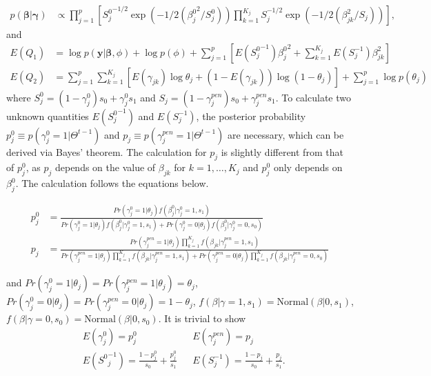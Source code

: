 \documentclass[AMA,STIX1COL,]{WileyNJD-v2}
\begin{document}
\[
\begin{aligned}
p(\boldsymbol{\beta }| \boldsymbol{\gamma}) &\propto \prod\limits_{j=1}^{p}\left[{S^0_j}^{-1/2}\exp(-1/2({\beta^0_{j}}^2/S^0_{j}))\prod\limits_{k=1}^{K_j}S_{j}^{-1/2}\exp(-1/2(\beta_{jk}^2/S_{j}))\right],%
\end{aligned}
\] and \begin{align*}
E(Q_1) &= \log p(\textbf{y}|\boldsymbol{\beta}, \phi) + \log p(\phi) + \sum\limits_{j=1}^{p} \left[E({S^0_j}^{-1}){\beta^0_j}^2+\sum\limits_{k=1}^{K_j}E(S^{-1}_{j})\beta_{jk}^2\right]\\
E(Q_2) &= \sum\limits_{j=1}^{p}\sum\limits_{k=1}^{K_j} \left[ E(\gamma_{jk})\log \theta_j + (1-E(\gamma_{jk})) \log (1-\theta_j)\right] +  \sum\limits_{j=1}^{p}\log p(\theta_j)
\end{align*} where
\(S_{j}^0 = (1-\gamma^{0}_{j}) s_0 + \gamma^{0}_{j} s_1\) and
\(S_{j} = (1-\gamma^{pen}_{j}) s_0 + \gamma^{pen}_{j} s_1\). To
calculate two unknown quantities \(E({S_j^0}^{-1})\) and
\(E(S^{-1}_j)\), the posterior probability
\(p^0_{j} \equiv p(\gamma^{0}_{j}=1|\Theta^{t-1})\) and
\(p_{j} \equiv p(\gamma^{pen}_{j}=1|\Theta^{t-1})\) are necessary, which
can be derived via Bayes' theorem. The calculation for \(p_j\) is
slightly different from that of \(p^0_j\), as \(p_j\) depends on the
value of \(\beta_{jk}\) for \(k=1, \dots, K_j\) and \(p^0_j\) only
depends on \(\beta_j^0\). The calculation follows the equations below.

\[
\begin{aligned}
p_{j}^0 &= \frac{Pr(\gamma_{j}^0 = 1|\theta_j)f(\beta_{j}^0|\gamma_{j}^0=1, s_1) }{Pr(\gamma_{j}^0 = 1|\theta_j)f(\beta_{j}^0|\gamma_{j}^0=1, s_1) + Pr(\gamma_{j}^0 = 0|\theta_j)f(\beta^0_{j}|\gamma^0_{j}=0, s_0)}\\
p_{j} &= \frac{Pr(\gamma^{pen}_{j} = 1|\theta_j)\prod\limits_{k=1}^{K_j}f(\beta_{jk}|\gamma^{pen}_{j}=1, s_1) }{Pr(\gamma^{pen}_{j} = 1|\theta_j)\prod\limits_{k=1}^{K_j}f(\beta_{jk}|\gamma^{pen}_{j}=1, s_1) + Pr(\gamma^{pen}_{j} = 0|\theta_j)\prod\limits_{k=1}^{K_j}f(\beta_{jk}|\gamma^{pen}_{j}=0, s_0)}
\end{aligned}
\]

and
\(Pr(\gamma_{j}^{0} = 1|\theta_j) =Pr(\gamma_{j}^{pen} = 1|\theta_j) = \theta_j\),
\(Pr(\gamma_{j}^{0} = 0|\theta_j) = Pr(\gamma_{j}^{pen} = 0|\theta_j) = 1-\theta_j\),
\(f(\beta|\gamma=1, s_1) = \text{Normal}(\beta|0 , s_1)\),
\(f(\beta|\gamma=0, s_0) = \text{Normal}(\beta|0 , s_0)\). It is trivial
to show \[
\begin{aligned}
&E(\gamma^0_{j})  = p^0_{j} & &E(\gamma^{pen}_{j})  = p_{j}\\
&E({S^0}^{-1}_{j}) = \frac{1-p^{0}_{j}}{s_0} + \frac{p^{0}_{j}}{s_1} & &E(S^{-1}_{j}) = \frac{1-p_{j}}{s_0} + \frac{p_{j}}{s_1}.
\end{aligned}
\]
\end{document}
